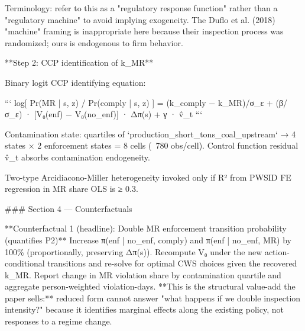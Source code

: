 \documentclass{article}
\begin{document}
Terminology: refer to this as a "regulatory response function" rather than a "regulatory machine" to avoid implying exogeneity. The Duflo et al. (2018) "machine" framing is inappropriate here because their inspection process was randomized; ours is endogenous to firm behavior.

**Step 2: CCP identification of k_MR**

Binary logit CCP identifying equation:

```
log[ Pr(MR | s, z) / Pr(comply | s, z) ] = (k_comply − k_MR)/σ_ε
                                           + (β/σ_ε) · [V₀(enf) − V₀(no_enf)] · Δπ(s)
                                           + γ · v̂_t
```

Contamination state: quartiles of `production_short_tons_coal_upstream` → 4 states × 2 enforcement states = 8 cells (~780 obs/cell). Control function residual v̂_t absorbs contamination endogeneity.

Two-type Arcidiacono-Miller heterogeneity invoked only if R² from PWSID FE regression in MR share OLS is ≥ 0.3.

### Section 4 — Counterfactuals

**Counterfactual 1 (headline): Double MR enforcement transition probability (quantifies P2)**
Increase π(enf | no_enf, comply) and π(enf | no_enf, MR) by 100\% (proportionally, preserving Δπ(s)). Recompute V₀ under the new action-conditional transitions and re-solve for optimal CWS choices given the recovered k_MR. Report change in MR violation share by contamination quartile and aggregate person-weighted violation-days. **This is the structural value-add the paper sells:** reduced form cannot answer "what happens if we double inspection intensity?" because it identifies marginal effects along the existing policy, not responses to a regime change.


















\newpage
\end{document}
